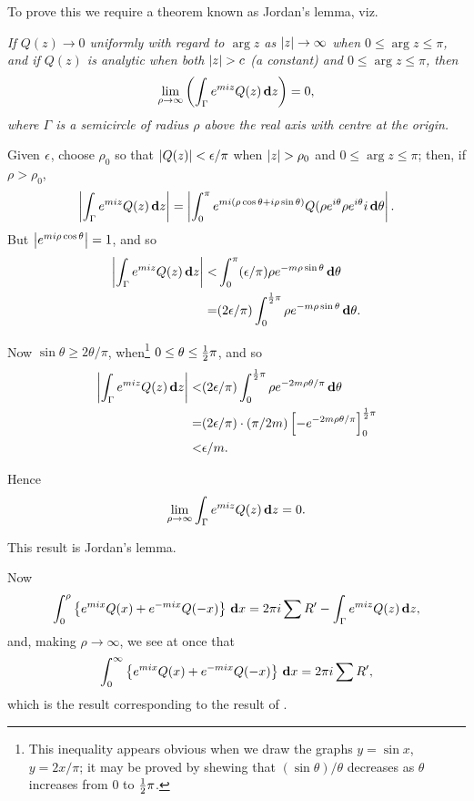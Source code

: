 To prove this we require a theorem known as Jordan's lemma, viz.

\emph{If $Q(z) \rightarrow 0$ uniformly with regard to $\arg z$ as
  $\left| z \right| \rightarrow \infty$ when $0 \leq \arg z \leq \pi$,
  and if $Q(z)$ is analytic when both $\left| z \right| > c$ (a constant)
  and $0 \leq \arg z \leq \pi$, then
  $$
  \lim_{\rho\rightarrow\infty}
  \left(  \int_{\Gamma} e^{miz} Q(z) \, \mathbf{d} z   \right)
  =
  0,
  $$
  where $\Gamma$ is a semicircle of radius $\rho$ above the real axis with centre at
  the origin.}

Given $\epsilon$, choose $\rho_{0}$ so that $\left| Q(z) \right| < \epsilon/\pi$
when $\left| z \right| > \rho_{0}$ and
$0 \leq \arg z \leq \pi$;
then, if $\rho > \rho_{0}$,
$$
\left|  \int_{\Gamma} e^{miz} Q(z) \, \mathbf{d} z  \right|
=
\left| 
  \int_{0}^{\pi}
  e^{mi (\rho \cos\theta + i\rho \sin\theta)}
  Q(\rho e^{i\theta}
  \rho e^{i \theta}
  i \, \mathbf{d} \theta
 \right|.
$$
But $\left|  e^{mi\rho\cos\theta}  \right| = 1$, and so
\begin{align*}
  \left|  \int_{\Gamma} e^{miz} Q(z) \, \mathbf{d} z  \right|
  <&
  \int_{0}^{\pi} (\epsilon/\pi) \rho e^{-m\rho\sin\theta} \, \mathbf{d}\theta
  \\
  =&
  (2\epsilon/\pi)
  \int_{0}^{\frac{1}{2}\pi} \rho e^{-m\rho\sin\theta} \, \mathbf{d}\theta.
\end{align*}

Now $\sin\theta \geq 2\theta/\pi$, when\footnote{This inequality
  appears obvious when we draw the graphs $y = \sin x$, $y = 2x/\pi$;
  it may be proved by shewing that $(\sin\theta)/\theta$ decreases as
  $\theta$ increases from $0$ to $\frac{1}{2}\pi$.
} $0 \leq \theta \leq \frac{1}{2}\pi$, and so 
\begin{align*}
  \left|  \int_{\Gamma} e^{miz} Q(z) \, \mathbf{d} z  \right|
  <&
  (2\epsilon/\pi)
  \int_{0}^{\frac{1}{2}\pi}
  \rho e^{-2m\rho\theta/\pi} \, \mathbf{d}\theta
  \\
  =&
  (2\epsilon/\pi) \cdot (\pi/2m)
  \left[  -e^{-2m\rho\theta/\pi}  \right]_{0}^{\frac{1}{2}\pi}
  \\
  <&
  \epsilon/m.
\end{align*}

%
%

Hence
$$
\lim_{\rho\rightarrow\infty} \int_{\Gamma} e^{miz} Q(z) \, \mathbf{d} z = 0.
$$

This result is Jordan's lemma.

Now
$$
\int_{0}^{\rho}
\left\{ 
  e^{mix} Q(x) + e^{-mix} Q(-x)
 \right\}
\, \mathbf{d} x
=
2 \pi i \sum R'
-
\int_{\Gamma} e^{miz} Q(z) \, \mathbf{d} z,
$$
and, making $\rho\rightarrow\infty$, we see at once that
$$
\int_{0}^{\infty}
\left\{ 
  e^{mix} Q(x) + e^{-mix} Q(-x)
 \right\}
\, \mathbf{d} x
=
2 \pi i \sum R',
$$
which is the result corresponding to the result of .

